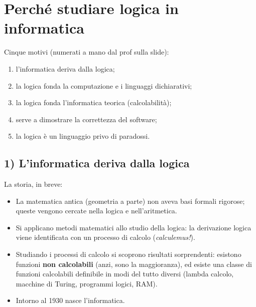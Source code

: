 \section{Perché studiare logica in informatica}

Cinque motivi (numerati a mano dal prof sulla slide):
\begin{enumerate}
  \item l'informatica deriva dalla logica;
  \item la logica fonda la computazione e i linguaggi dichiarativi;
  \item la logica fonda l'informatica teorica (calcolabilità);
  \item serve a dimostrare la correttezza del software;
  \item la logica è un linguaggio privo di paradossi.
\end{enumerate}

\subsection{1) L'informatica deriva dalla logica}


La storia, in breve:
\begin{itemize}
  \item La matematica antica (geometria a parte) non aveva basi formali
        rigorose; queste vengono cercate nella logica e nell'aritmetica.
  \item Si applicano metodi matematici allo studio della logica: la
        derivazione logica viene identificata con un processo di calcolo
        (\emph{calculemus!}).
  \item Studiando i processi di calcolo si scoprono risultati sorprendenti:
        esistono funzioni \textbf{non calcolabili} (anzi, sono la maggioranza),
        ed esiste una classe di funzioni calcolabili definibile in modi del
        tutto diversi (lambda calcolo, macchine di Turing, programmi logici,
        RAM).
  \item Intorno al 1930 nasce l'informatica.
\end{itemize}


